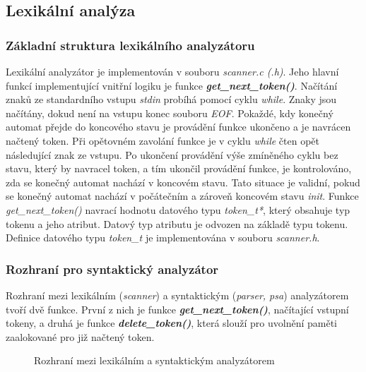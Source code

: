 \documentclass[a4paper, 12pt]{article}
\begin{document}
\subsection{Lexikální analýza}
\subsubsection{Základní struktura lexikálního analyzátoru}
Lexikální analyzátor je implementován v souboru \textit{scanner.c (.h)}. Jeho hlavní funkcí implementující vnitřní logiku je funkce \textit{\textbf{get\_next\_token()}}. Načítání znaků ze standardního vstupu \textit{stdin} probíhá pomocí cyklu \textit{while}. Znaky jsou načítány, dokud není na vstupu konec souboru \textit{EOF}. Pokaždé, kdy konečný automat přejde do koncového stavu je provádění funkce ukončeno a je navrácen načtený token. Při opětovném zavolání funkce je v cyklu \textit{while} čten opět následující znak ze vstupu. Po ukončení provádění výše zmíněného cyklu bez stavu, který by navracel token, a tím ukončil provádění funkce, je kontrolováno, zda se konečný automat nachází v koncovém stavu. Tato situace je validní, pokud se konečný automat nachází v počátečním a zároveň koncovém stavu \textit{init}. Funkce \textit{get\_next\_token()} navrací hodnotu datového typu \textit{token\_t*}, který obsahuje typ tokenu a jeho atribut. Datový typ atributu je odvozen na základě typu tokenu. Definice datového typu \textit{token\_t} je implementována v souboru \textit{scanner.h}.

\subsubsection{Rozhraní pro syntaktický analyzátor}
Rozhraní mezi lexikálním (\textit{scanner}) a syntaktickým (\textit{parser, psa}) analyzátorem tvoří dvě funkce. První z nich je funkce \textit{\textbf{get\_next\_token()}}, načítající vstupní tokeny, a druhá je funkce \newline \textit{\textbf{delete\_token()}}, která slouží pro uvolnění paměti zaalokované pro již načtený token.

\vspace{4cm}

\begin{figure}[ht!]
\begin{center}
\caption{Rozhraní mezi lexikálním a syntaktickým analyzátorem}
\end{center}
\end{figure}
\end{document}

